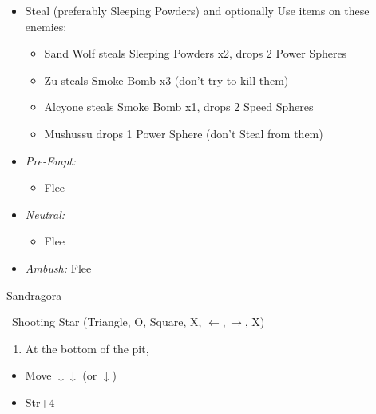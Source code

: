 \begin{encounters}
    \begin{itemize}
        \item Steal (preferably Sleeping Powders) and optionally Use items on these enemies:
        \begin{itemize}
            \item Sand Wolf steals Sleeping Powders x2, drops 2 Power Spheres
            \item Zu steals Smoke Bomb x3 (don't try to kill them)
            \item Alcyone steals Smoke Bomb x1, drops 2 Speed Spheres
            \item Mushussu drops 1 Power Sphere (don't Steal from them)
        \end{itemize}
        \item \textit{Pre-Empt:}
        \begin{itemize}
            \tidusf Defend
            \rikkuf Steal or Use a Smoke Bomb/Silence Grenade/Sleeping Powder
            \luluf Defend
            \item Flee
        \end{itemize}
        \item \textit{Neutral:}
        \begin{itemize}
            \switch{\tidus}{\kimahri}
            \kimahrif Steal
            \rikkuf Switch for \tidus\ or Use a Smoke Bomb/Silence Grenade/Sleeping Powder
            \item Flee
        \end{itemize}
        \item \textit{Ambush:} Flee
    \end{itemize}
\end{encounters}
\begin{battle}{Sandragora}
    \begin{itemize}
        \switch{\tidus}{\auron}
        \auronf \od\ Shooting Star (Triangle, O, Square, X, $\leftarrow, \rightarrow$, X)
    \end{itemize}
\end{battle}
\begin{enumerate}[resume]
    \item At the bottom of the pit, 
\end{enumerate}
\begin{spheregrid}
    \begin{itemize}
        \tidusf
        \begin{itemize}
            \item Move $\downarrow\downarrow$ (or $\downarrow$)
            \item Str+4
        \end{itemize}
    \end{itemize}
\end{spheregrid}
